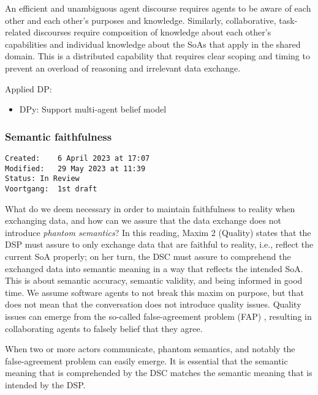 \documentclass[sort&compress,preprint,3p,authoryear,twocolumn]{elsarticle}
\providecommand{\tightlist}{%
  \setlength{\itemsep}{0pt}\setlength{\parskip}{0pt}}
\theoremstyle{break}			%
\begin{document}
\begin{mmconcern}\label{cncrn:qtymc}
An efficient and unambiguous agent discourse requires agents to be aware of each other and each other’s purposes and knowledge. Similarly, collaborative, task-related discourses require composition of knowledge about each other’s capabilities and individual knowledge about the SoAs that apply in the shared domain. This is a distributed capability that requires clear scoping and timing to prevent an overload of reasoning and irrelevant data exchange.
\end{mmconcern}

Applied DP:

\begin{itemize}
\tightlist
\item
  DPy: Support multi-agent belief model
\end{itemize}

\subsubsection{Semantic faithfulness}\label{semantic-faithfulness}

\begin{verbatim}
Created:    6 April 2023 at 17:07
Modified:   29 May 2023 at 11:39
Status: In Review
Voortgang:  1st draft
\end{verbatim}

What do we deem necessary in order to maintain faithfulness to reality
when exchanging data, and how can we assure that the data exchange does
not introduce \emph{phantom semantics}? In this reading, Maxim 2
(Quality) states that the DSP must assure to only exchange data that are
faithful to reality, i.e., reflect the current SoA properly; on her
turn, the DSC must assure to comprehend the exchanged data into semantic
meaning in a way that reflects the intended SoA. This is about semantic
accuracy, semantic validity, and being informed in good time. We assume
software agents to not break this maxim on purpose, but that does not
mean that the conversation does not introduce quality issues. Quality
issues can emerge from the so-called false-agreement problem (FAP)
\citep[Sec.2.4]{Guarino:1998wq}, resulting in collaborating agents to
falsely belief that they agree.

\begin{mmconcern}\label{cncrn:qlymc}
When two or more actors communicate, phantom semantics, and notably the false-agreement problem can easily emerge. It is essential that the semantic meaning that is comprehended by the DSC matches the semantic meaning that is intended by the DSP.
\end{mmconcern}
\end{document}
